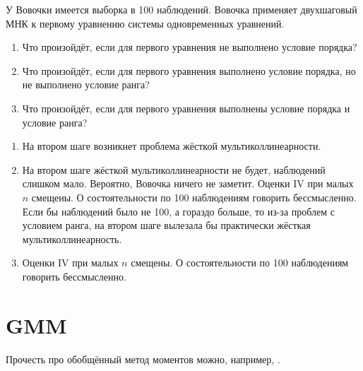 \begin{problem}
У Вовочки имеется выборка в 100 наблюдений. 
Вовочка применяет двухшаговый МНК к первому уравнению системы одновременных уравнений.

\begin{enumerate}
  \item Что произойдёт, если для первого уравнения не выполнено условие порядка?
  \item Что произойдёт, если для первого уравнения выполнено условие порядка, но не выполнено условие ранга?
  \item Что произойдёт, если для первого уравнения выполнены условие порядка и условие ранга?
\end{enumerate}
\begin{sol}
\begin{enumerate}
  \item На втором шаге возникнет проблема жёсткой мультиколлинеарности.
  \item На втором шаге жёсткой мультиколлинеарности не будет, наблюдений слишком мало. 
  Вероятно, Вовочка ничего не заметит. Оценки IV при малых $n$ смещены. 
  О состоятельности по 100 наблюдениям говорить бессмысленно. 
  Если бы наблюдений было не 100, а гораздо больше, то из-за проблем с условием ранга, на втором шаге вылезала бы 
  практически жёсткая мультиколлинеарность.
  \item Оценки IV при малых $n$ смещены. 
  О состоятельности по 100 наблюдениям говорить бессмысленно.
\end{enumerate}
\end{sol}
\end{problem}


\section{GMM}

Прочесть про обобщённый метод моментов можно, например, \cite{zsohar2010short}.

